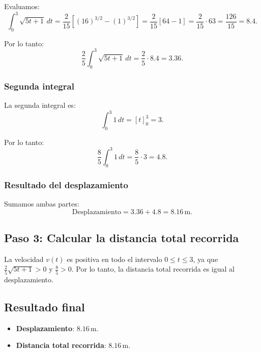 \documentclass[11pt,letterpaper]{article}
\begin{document}
Evaluamos:
\[
\int_{0}^{3} \sqrt{5t + 1} \, dt = \frac{2}{15} \left[ (16)^{3/2} - (1)^{3/2} \right] = \frac{2}{15} \left[ 64 - 1 \right] = \frac{2}{15} \cdot 63 = \frac{126}{15} = 8.4.
\]

Por lo tanto:
\[
\frac{2}{5} \int_{0}^{3} \sqrt{5t + 1} \, dt = \frac{2}{5} \cdot 8.4 = 3.36.
\]

\subsubsection*{Segunda integral}
La segunda integral es:
\[
\int_{0}^{3} 1 \, dt = [t]_{0}^{3} = 3.
\]

Por lo tanto:
\[
\frac{8}{5} \int_{0}^{3} 1 \, dt = \frac{8}{5} \cdot 3 = 4.8.
\]

\subsubsection*{Resultado del desplazamiento}
Sumamos ambas partes:
\[
\text{Desplazamiento} = 3.36 + 4.8 = 8.16 \, \text{m}.
\]

\subsection*{Paso 3: Calcular la distancia total recorrida}

La velocidad \(v(t)\) es positiva en todo el intervalo \(0 \leq t \leq 3\), ya que \(\frac{2}{5} \sqrt{5t + 1} > 0\) y \(\frac{8}{5} > 0\). Por lo tanto, la distancia total recorrida es igual al desplazamiento.

\subsection*{Resultado final}
\begin{itemize}
    \item \textbf{Desplazamiento}: \(8.16 \, \text{m}\).
    \item \textbf{Distancia total recorrida}: \(8.16 \, \text{m}\).
\end{itemize}

\end{document}
